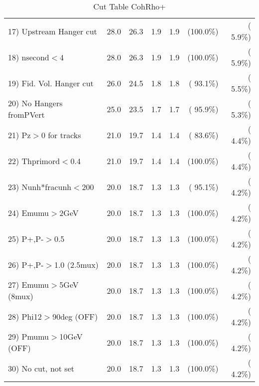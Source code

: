 \begin{table}[h!]
\begin{tabular}{||l||r|r|r|r|r|r||}
 17) Upstream Hanger cut  &         28.0 &         26.3 &          1.9 &          1.9 & (100.0\%) & (  5.9\%) \\
 18) nsecond$<$4          &         28.0 &         26.3 &          1.9 &          1.9 & (100.0\%) & (  5.9\%) \\
 19) Fid. Vol. Hanger cut &         26.0 &         24.5 &          1.8 &          1.8 & ( 93.1\%) & (  5.5\%) \\
 20) No Hangers fromPVert &         25.0 &         23.5 &          1.7 &          1.7 & ( 95.9\%) & (  5.3\%) \\
 21) Pz$>$0 for tracks    &         21.0 &         19.7 &          1.4 &          1.4 & ( 83.6\%) & (  4.4\%) \\
 22) Thprimord$<$0.4      &         21.0 &         19.7 &          1.4 &          1.4 & (100.0\%) & (  4.4\%) \\
 23) Nunh*fracunh$<$200   &         20.0 &         18.7 &          1.3 &          1.3 & ( 95.1\%) & (  4.2\%) \\
 24) Emumu$>$2GeV         &         20.0 &         18.7 &          1.3 &          1.3 & (100.0\%) & (  4.2\%) \\
 25) P+,P-$>$0.5          &         20.0 &         18.7 &          1.3 &          1.3 & (100.0\%) & (  4.2\%) \\
 26) P+,P-$>$1.0 (2.5mux) &         20.0 &         18.7 &          1.3 &          1.3 & (100.0\%) & (  4.2\%) \\
 27) Emumu$>$5GeV  (8mux) &         20.0 &         18.7 &          1.3 &          1.3 & (100.0\%) & (  4.2\%) \\
 28) Phi12$>$90deg  (OFF) &         20.0 &         18.7 &          1.3 &          1.3 & (100.0\%) & (  4.2\%) \\
 29) Pmumu$>$10GeV  (OFF) &         20.0 &         18.7 &          1.3 &          1.3 & (100.0\%) & (  4.2\%) \\
 30) No cut, not set      &         20.0 &         18.7 &          1.3 &          1.3 & (100.0\%) & (  4.2\%) \\
 \hline
 \hline
 \end{tabular}
 \caption{Cut Table  CohRho+  }
 \label{tab-cutcohjpsi-mumu_anumunc}
 \end{table}
